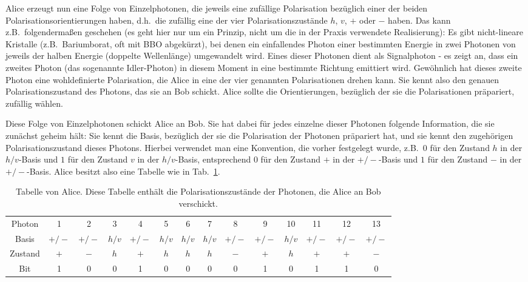 Alice erzeugt nun eine Folge von Einzelphotonen, die jeweils eine zuf\"allige Polarisation bez\"uglich
einer der beiden Polarisationsorientierungen haben, d.h.\ die zuf\"allig eine der vier Polarisationszust\"ande
$h$, $v$, $+$ oder $-$ haben. Das kann z.B.\ folgenderma\ss en geschehen (es geht
hier nur um ein Prinzip, nicht um die in der Praxis verwendete Realisierung): Es gibt nicht-lineare Kristalle
(z.B.\ Bariumborat, oft mit BBO abgek\"urzt), bei denen ein einfallendes 
Photon einer bestimmten Energie in zwei Photonen
von jeweils der halben Energie (doppelte Wellenl\"ange) umgewandelt wird. Eines dieser Photonen dient
als Signalphoton - es zeigt an, dass ein zweites Photon (das sogenannte Idler-Photon) in diesem Moment in eine 
bestimmte Richtung emittiert wird. Gew\"ohnlich hat dieses zweite Photon eine wohldefinierte
Polarisation, die Alice in eine der vier genannten Polarisationen drehen kann. Sie kennt also den genauen 
Polarisationszustand des Photons, das sie an Bob schickt. Alice sollte die Orientierungen, bez\"uglich der sie die 
Polarisationen pr\"apariert, zuf\"allig w\"ahlen.

Diese Folge von Einzelphotonen schickt Alice an Bob. Sie hat dabei f\"ur jedes einzelne dieser Photonen folgende
Information, die sie zun\"achst geheim h\"alt: Sie kennt die Basis, bez\"uglich der sie die Polarisation der Photonen
pr\"apariert hat, und sie kennt den zugeh\"origen Polarisationszustand dieses Photons. Hierbei verwendet man eine
Konvention, die vorher festgelegt wurde, z.B.\ $0$ f\"ur den Zustand $h$ in der $h/v$-Basis und $1$ 
f\"ur den Zustand $v$ in der $h/v$-Basis, entsprechend $0$ f\"ur den Zustand $+$ in der $+/-$-Basis und $1$ f\"ur
den Zustand $-$ in der $+/-$-Basis. Alice besitzt also eine
Tabelle wie in Tab.\ \ref{tab_Alice1}.
\begin{table}[htb]
\begin{tabular}{c|c|c|c|c|c|c|c|c|c|c|c|c|c}
Photon & 1 & 2 & 3 & 4 & 5 & 6 & 7 & 8 & 9 & 10 & 11 & 12 & 13  \\
Basis & $+/-$ & $+/-$ & $h/v$ & $+/-$ & $h/v$ & $h/v$ & $h/v$ & $+/-$ & $+/-$ & $h/v$ & $+/-$ & $+/-$  & $+/-$  \\
Zustand & $+$ & $-$ & $h$ & $+$ & $h$ & $h$ & $h$ & $-$ & $+$ & $h$ & $+$ & $+$ & $-$ \\
Bit & 1 & 0 & 0 & 1 & 0 & 0 & 0 & 0 & 1 & 0 & 1 & 1 & 0       
\end{tabular}
\caption{\label{tab_Alice1}%
Tabelle von Alice. Diese Tabelle enth\"alt die Polarisationszust\"ande der Photonen, die Alice an Bob verschickt.}         
\end{table}

